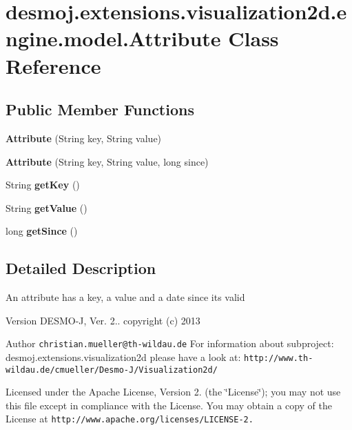 \section{desmoj.\-extensions.\-visualization2d.\-engine.\-model.\-Attribute Class Reference}
\label{classdesmoj_1_1extensions_1_1visualization2d_1_1engine_1_1model_1_1_attribute}
\subsection*{Public Member Functions}
\begin{DoxyCompactItemize}
\item 
{\bfseries Attribute} (String key, String value)\label{classdesmoj_1_1extensions_1_1visualization2d_1_1engine_1_1model_1_1_attribute_a5e2bf98336786b97660d054a37adf8e2}

\item 
{\bfseries Attribute} (String key, String value, long since)\label{classdesmoj_1_1extensions_1_1visualization2d_1_1engine_1_1model_1_1_attribute_a2a88c8c9e5d2b7dc32eb8e748cb4eed2}

\item 
String {\bfseries get\-Key} ()\label{classdesmoj_1_1extensions_1_1visualization2d_1_1engine_1_1model_1_1_attribute_a5998e5d13dea2880292c44da06e90645}

\item 
String {\bfseries get\-Value} ()\label{classdesmoj_1_1extensions_1_1visualization2d_1_1engine_1_1model_1_1_attribute_ac843d439e70707b5f3b6cfdabe444f4c}

\item 
long {\bfseries get\-Since} ()\label{classdesmoj_1_1extensions_1_1visualization2d_1_1engine_1_1model_1_1_attribute_a6646d666e654054b4df5f08296d1e4c0}

\end{DoxyCompactItemize}


\subsection{Detailed Description}
An attribute has a key, a value and a date since its valid

\begin{DoxyVersion}{Version}
D\-E\-S\-M\-O-\/\-J, Ver. 2.. copyright (c) 2013 
\end{DoxyVersion}
\begin{DoxyAuthor}{Author}
{\tt christian.\-mueller@th-\/wildau.\-de} For information about subproject\-: desmoj.\-extensions.\-visualization2d please have a look at\-: {\tt http\-://www.\-th-\/wildau.\-de/cmueller/\-Desmo-\/\-J/\-Visualization2d/}
\end{DoxyAuthor}
Licensed under the Apache License, Version 2. (the \char`\"{}\-License\char`\"{}); you may not use this file except in compliance with the License. You may obtain a copy of the License at {\tt http\-://www.\-apache.\-org/licenses/\-L\-I\-C\-E\-N\-S\-E-\/2.}

